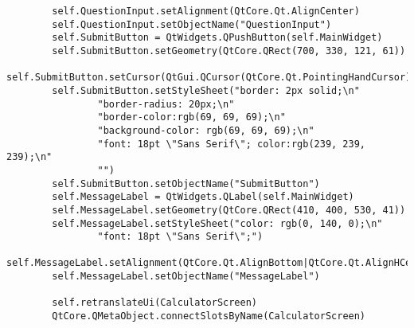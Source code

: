 \documentclass{article}
\begin{document}
\begin{lstlisting}
        self.QuestionInput.setAlignment(QtCore.Qt.AlignCenter)
        self.QuestionInput.setObjectName("QuestionInput")
        self.SubmitButton = QtWidgets.QPushButton(self.MainWidget)
        self.SubmitButton.setGeometry(QtCore.QRect(700, 330, 121, 61))
        self.SubmitButton.setCursor(QtGui.QCursor(QtCore.Qt.PointingHandCursor))
        self.SubmitButton.setStyleSheet("border: 2px solid;\n"
                "border-radius: 20px;\n"
                "border-color:rgb(69, 69, 69);\n"
                "background-color: rgb(69, 69, 69);\n"
                "font: 18pt \"Sans Serif\"; color:rgb(239, 239, 239);\n"
                "")
        self.SubmitButton.setObjectName("SubmitButton")
        self.MessageLabel = QtWidgets.QLabel(self.MainWidget)
        self.MessageLabel.setGeometry(QtCore.QRect(410, 400, 530, 41))
        self.MessageLabel.setStyleSheet("color: rgb(0, 140, 0);\n"
                "font: 18pt \"Sans Serif\";")
        self.MessageLabel.setAlignment(QtCore.Qt.AlignBottom|QtCore.Qt.AlignHCenter)
        self.MessageLabel.setObjectName("MessageLabel")

        self.retranslateUi(CalculatorScreen)
        QtCore.QMetaObject.connectSlotsByName(CalculatorScreen)


\end{lstlisting}
\end{document}
